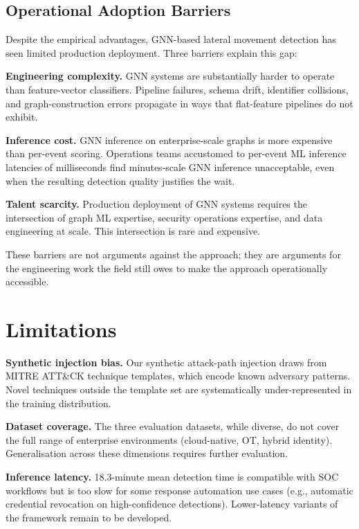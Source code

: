 \documentclass[sigconf,nonacm]{acmart}
\begin{document}
\subsection{Operational Adoption Barriers}

Despite the empirical advantages, GNN-based lateral movement detection has
seen limited production deployment. Three barriers explain this gap:

\textbf{Engineering complexity.} GNN systems are substantially harder to
operate than feature-vector classifiers. Pipeline failures, schema drift,
identifier collisions, and graph-construction errors propagate in ways that
flat-feature pipelines do not exhibit.

\textbf{Inference cost.} GNN inference on enterprise-scale graphs is more
expensive than per-event scoring. Operations teams accustomed to per-event
ML inference latencies of milliseconds find minutes-scale GNN inference
unacceptable, even when the resulting detection quality justifies the wait.

\textbf{Talent scarcity.} Production deployment of GNN systems requires the
intersection of graph ML expertise, security operations expertise, and data
engineering at scale. This intersection is rare and expensive.

These barriers are not arguments against the approach; they are arguments
for the engineering work the field still owes to make the approach
operationally accessible.

\section{Limitations}

\textbf{Synthetic injection bias.} Our synthetic attack-path injection draws
from MITRE ATT\&CK technique templates, which encode known adversary patterns.
Novel techniques outside the template set are systematically under-represented
in the training distribution.

\textbf{Dataset coverage.} The three evaluation datasets, while diverse, do
not cover the full range of enterprise environments (cloud-native, OT, hybrid
identity). Generalisation across these dimensions requires further evaluation.

\textbf{Inference latency.} 18.3-minute mean detection time is compatible with
SOC workflows but is too slow for some response automation use cases (e.g.,
automatic credential revocation on high-confidence detections). Lower-latency
variants of the framework remain to be developed.
\end{document}
